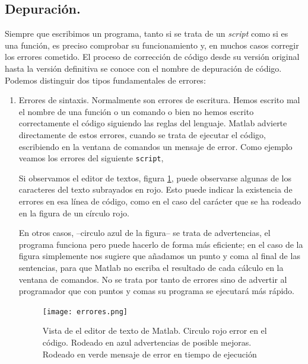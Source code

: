 \subsection{Depuración.}
Siempre que escribimos un programa, tanto si se trata de un \emph{script} como si es una función, es preciso comprobar su funcionamiento y, en  muchos casos corregir los errores cometido. El proceso de corrección de código desde su versión original hasta la versión definitiva se conoce con el nombre de depuración de código. Podemos distinguir dos tipos fundamentales de errores:

\begin{enumerate} 
\item Errores de sintaxis. Normalmente son errores de escritura. Hemos escrito mal el nombre de una función o un comando o bien no hemos escrito correctamente el código siguiendo las reglas del lenguaje. Matlab advierte directamente de estos errores, cuando se trata de ejecutar el código, escribiendo en la ventana de comandos un mensaje de error. Como ejemplo veamos los errores del siguiente \texttt{script},



Si observamos el editor de textos, figura \ref{fig:ederror}, puede observarse algunas de los caracteres del texto subrayados en rojo. Esto puede indicar la existencia de errores en esa línea de código, como en el caso del carácter que se ha rodeado en la figura de un círculo rojo. 

En otros casos, --circulo azul de la figura-- se trata de advertencias, el programa funciona pero puede hacerlo de forma más eficiente; en el caso de la figura simplemente nos sugiere que añadamos un punto y coma al final de las sentencias, para que Matlab no escriba el resultado de cada cálculo en la ventana de comandos. No se trata por tanto de errores sino de advertir al programador que con puntos y comas su programa se ejecutará más rápido.

\begin{figure}[h]
\centering
\texttt{[image: errores.png]}
\caption{Vista de el editor de texto de Matlab. Circulo rojo error en el código. Rodeado en azul advertencias de posible mejoras. Rodeado en verde mensaje de error en tiempo de ejecución}
\label{fig:ederror}
\end{figure}


\end{enumerate}

